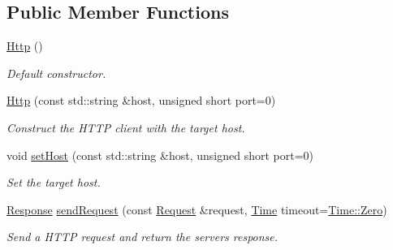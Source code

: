 \subsection*{Public Member Functions}
\begin{DoxyCompactItemize}
\item 
\mbox{\hyperlink{classsf_1_1_http_abe2360194f99bdde402c9f97a85cf067}{Http}} ()
\begin{DoxyCompactList}\small\item\em Default constructor. \end{DoxyCompactList}\item 
\mbox{\hyperlink{classsf_1_1_http_a79efd844a735f083fcce0edbf1092385}{Http}} (const std\+::string \&host, unsigned short port=0)
\begin{DoxyCompactList}\small\item\em Construct the H\+T\+TP client with the target host. \end{DoxyCompactList}\item 
void \mbox{\hyperlink{classsf_1_1_http_a55121d543b61c41cf20b885a97b04e65}{set\+Host}} (const std\+::string \&host, unsigned short port=0)
\begin{DoxyCompactList}\small\item\em Set the target host. \end{DoxyCompactList}\item 
\mbox{\hyperlink{classsf_1_1_http_1_1_response}{Response}} \mbox{\hyperlink{classsf_1_1_http_aaf09ebfb5e00dcc82e0d494d5c6a9e2a}{send\+Request}} (const \mbox{\hyperlink{classsf_1_1_http_1_1_request}{Request}} \&request, \mbox{\hyperlink{classsf_1_1_time}{Time}} timeout=\mbox{\hyperlink{classsf_1_1_time_a8db127b632fa8da21550e7282af11fa0}{Time\+::\+Zero}})
\begin{DoxyCompactList}\small\item\em Send a H\+T\+TP request and return the server\textquotesingle{}s response. \end{DoxyCompactList}\end{DoxyCompactItemize}

